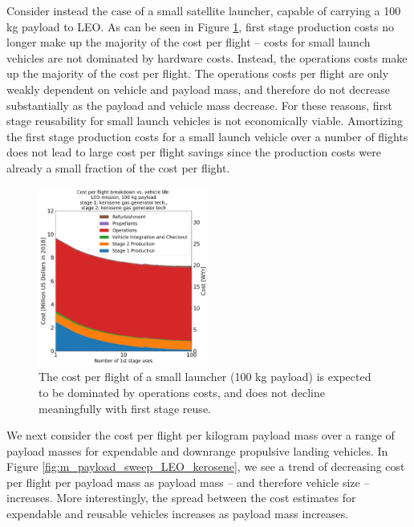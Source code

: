 \documentclass{iaf-iac}
\begin{document}
\begin{multicols}{2}
Consider instead the case of a small satellite launcher, capable of carrying a 100 kg payload to LEO. As can be seen in Figure \ref{fig:cpf_stackplot_reuses_sweep_small_sat}, first stage production costs no longer make up the majority of the cost per flight -- costs for small launch vehicles are not dominated by hardware costs. Instead, the operations costs make up the majority of the cost per flight. The operations costs per flight are only weakly dependent on vehicle and payload mass, and therefore do not decrease substantially as the payload and vehicle mass decrease. For these reasons, first stage reusability for small launch vehicles is not economically viable. Amortizing the first stage production costs for a small launch vehicle over a number of flights does not lead to large cost per flight savings since the production costs were already a small fraction of the cost per flight.



\begin{figure}[H]
    \centering
    \includegraphics[width=0.5\textwidth]{../../lvreuse/analysis/combined/plots/cpf_stackplot_reuses_sweep_small_sat}
    \caption{\label{fig:cpf_stackplot_reuses_sweep_small_sat} The cost per flight of a small launcher (100 kg payload) is expected to be dominated by operations costs, and does not decline meaningfully with first stage reuse.}
\end{figure}


We next consider the cost per flight per kilogram payload mass over a range of payload masses for expendable and downrange propulsive landing vehicles. In Figure \ref{fig:m_payload_sweep_LEO_kerosene}, we see a trend of decreasing cost per flight per payload mass as payload mass -- and therefore vehicle size -- increases. More interestingly, the spread between the cost estimates for expendable and reusable vehicles increases as payload mass increases. 



\end{multicols}
\end{document}
